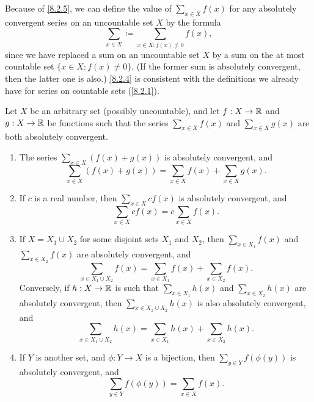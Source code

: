 \begin{note}
  Because of \cref{8.2.5}, we can define the value of \(\sum_{x \in X} f(x)\) for any absolutely convergent series on an uncountable set \(X\) by the formula
  \[
    \sum_{x \in X} \coloneqq \sum_{x \in X : f(x) \neq 0} f(x),
  \]
  since we have replaced a sum on an uncountable set \(X\) by a sum on the at most countable set \(\{x \in X : f(x) \neq 0\}\).
  (If the former sum is absolutely convergent, then the latter one is also.)
  \cref{8.2.4} is consistent with the definitions we already have for series on countable sets (\cref{8.2.1}).
\end{note}

\begin{prop}\label{8.2.6}
  Let \(X\) be an arbitrary set (possibly uncountable), and let \(f : X \to \mathbb{R}\) and \(g : X \to \mathbb{R}\) be functions such that the series \(\sum_{x \in X} f(x)\) and \(\sum_{x \in X} g(x)\) are both absolutely convergent.
  \begin{enumerate}
    \item The series \(\sum_{x \in X} (f(x) + g(x))\) is absolutely convergent, and
          \[
            \sum_{x \in X} (f(x) + g(x)) = \sum_{x \in X} f(x) + \sum_{x \in X} g(x).
          \]
    \item If \(c\) is a real number, then \(\sum_{x \in X} cf(x)\) is absolutely convergent, and
          \[
            \sum_{x \in X} cf(x) = c \sum_{x \in X} f(x).
          \]
    \item If \(X = X_1 \cup X_2\) for some disjoint sets \(X_1\) and \(X_2\), then \(\sum_{x \in X_1} f(x)\) and \\
          \(\sum_{x \in X_2} f(x)\) are absolutely convergent, and
          \[
            \sum_{x \in X_1 \cup X_2} f(x) = \sum_{x \in X_1} f(x) + \sum_{x \in X_2} f(x).
          \]
          Conversely, if \(h : X \to \mathbb{R}\) is such that \(\sum_{x \in X_1} h(x)\) and \(\sum_{x \in X_2} h(x)\) are absolutely convergent, then \(\sum_{x \in X_1 \cup X_2} h(x)\) is also absolutely convergent, and
          \[
            \sum_{x \in X_1 \cup X_2} h(x) = \sum_{x \in X_1} h(x) + \sum_{x \in X_2} h(x).
          \]
    \item If \(Y\) is another set, and \(\phi : Y \to X\) is a bijection, then \(\sum_{y \in Y} f(\phi(y))\) is absolutely convergent, and
          \[
            \sum_{y \in Y} f(\phi(y)) = \sum_{x \in X} f(x).
          \]
  \end{enumerate}
\end{prop}

